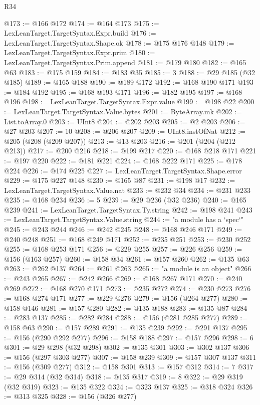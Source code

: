 \begin{lexlean}{R34}
\begin{coremodule}
@173 := @166 @172
@174 := @164 @173
@175 := LexLeanTarget.TargetSyntax.Expr.build
@176 := LexLeanTarget.TargetSyntax.Shape.ok
@178 := @175 @176 @148
@179 := LexLeanTarget.TargetSyntax.Expr.prim
@180 := LexLeanTarget.TargetSyntax.Prim.append
@181 := @179 @180
@182 := @165 @63
@183 := @175 @159
@184 := @183 @35
@185 := 3
@188 := @29 @185 (@32 @185)
@189 := @165 @188
@190 := @189 @172
@192 := @168 @190 @171
@193 := @184 @192
@195 := @168 @193 @171
@196 := @182 @195
@197 := @168 @196
@198 := LexLeanTarget.TargetSyntax.Expr.value
@199 := @198 @22
@200 := LexLeanTarget.TargetSyntax.Value.bytes
@201 := ByteArray.mk
@202 := List.toArray.{0}
@203 := UInt8
@204 := @202 @203
@205 := @2 @203
@206 := @27 @203
@207 := 10
@208 := @206 @207
@209 := UInt8.instOfNat
@212 := @205 (@208 (@209 @207))
@213 := @13 @203
@216 := @201 (@204 (@212 @213))
@217 := @200 @216
@218 := @199 @217
@220 := @168 @218 @171
@221 := @197 @220
@222 := @181 @221
@224 := @168 @222 @171
@225 := @178 @224
@226 := @174 @225
@227 := LexLeanTarget.TargetSyntax.Shape.error
@229 := @175 @227 @148
@230 := @165 @87
@231 := @198 @17
@232 := LexLeanTarget.TargetSyntax.Value.nat
@233 := @232 @34
@234 := @231 @233
@235 := @168 @234
@236 := 5
@239 := @29 @236 (@32 @236)
@240 := @165 @239
@241 := LexLeanTarget.TargetSyntax.Ty.string
@242 := @198 @241
@243 := LexLeanTarget.TargetSyntax.Value.string
@244 := "a module has a `spec`"
@245 := @243 @244
@246 := @242 @245
@248 := @168 @246 @171
@249 := @240 @248
@251 := @168 @249 @171
@252 := @235 @251
@253 := @230 @252
@255 := @168 @253 @171
@256 := @229 @255
@257 := @226 @256
@259 := @156 (@163 @257)
@260 := @158 @34
@261 := @157 @260
@262 := @135 @63
@263 := @262 @137
@264 := @261 @263
@265 := "a module is an object"
@266 := @243 @265
@267 := @242 @266
@269 := @168 @267 @171
@270 := @240 @269
@272 := @168 @270 @171
@273 := @235 @272
@274 := @230 @273
@276 := @168 @274 @171
@277 := @229 @276
@279 := @156 (@264 @277)
@280 := @158 @146
@281 := @157 @280
@282 := @135 @188
@283 := @135 @87
@284 := @283 @137
@285 := @282 @284
@288 := @156 (@281 @285 @277)
@289 := @158 @63
@290 := @157 @289
@291 := @135 @239
@292 := @291 @137
@295 := @156 (@290 @292 @277)
@296 := @158 @188
@297 := @157 @296
@298 := 6
@301 := @29 @298 (@32 @298)
@302 := @135 @301
@303 := @302 @137
@306 := @156 (@297 @303 @277)
@307 := @158 @239
@309 := @157 @307 @137
@311 := @156 (@309 @277)
@312 := @158 @301
@313 := @157 @312
@314 := 7
@317 := @29 @314 (@32 @314)
@318 := @135 @317
@319 := 8
@322 := @29 @319 (@32 @319)
@323 := @135 @322
@324 := @323 @137
@325 := @318 @324
@326 := @313 @325
@328 := @156 (@326 @277)

\end{coremodule}
\end{lexlean}
